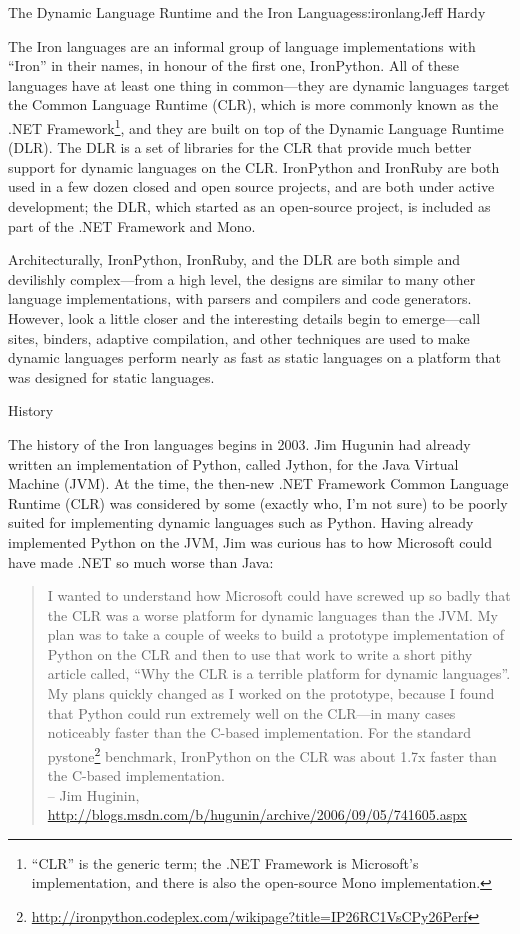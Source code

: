 \begin{aosachapter}{The Dynamic Language Runtime and the Iron Languages}{s:ironlang}{Jeff Hardy}

The Iron languages are an informal group of language implementations with ``Iron'' in their names, in honour of the first one, IronPython. All of these languages have at least one thing in common---they are dynamic languages target the Common Language Runtime (CLR), which is more commonly known as the .NET Framework\footnote{``CLR'' is the generic term; the .NET Framework is Microsoft's implementation, and there is also the open-source Mono implementation.}, and they are built on top of the Dynamic Language Runtime (DLR).  The DLR is a set of libraries for the CLR that provide much better support for dynamic languages on the CLR. IronPython and IronRuby are both used in a few dozen closed and open source projects, and are both under active development; the DLR, which started as an open-source project, is included as part of the .NET Framework and Mono.

Architecturally, IronPython, IronRuby, and the DLR are both simple and devilishly complex---from a high level, the designs are similar to many other language implementations, with parsers and compilers and code generators. However, look a little closer and the interesting details begin to emerge---call sites, binders, adaptive compilation, and other techniques are used to make dynamic languages perform nearly as fast as static languages on a platform that was designed for static languages. 

\begin{aosasect1}{History}

The history of the Iron languages begins in 2003. Jim Hugunin had already written an implementation of Python, called Jython, for the Java Virtual Machine (JVM). At the time, the then-new .NET Framework Common Language Runtime (CLR) was considered by some (exactly who, I'm not sure) to be poorly suited for implementing dynamic languages such as Python. Having already implemented Python on the JVM, Jim was curious has to how Microsoft could have made .NET so much worse than Java:

\begin{quotation}
I wanted to understand how Microsoft could have screwed up so badly that the CLR was a worse platform for dynamic languages than the JVM.  My plan was to take a couple of weeks to build a prototype implementation of Python on the CLR and then to use that work to write a short pithy article called, ``Why the CLR is a terrible platform for dynamic languages''.  My plans quickly changed as I worked on the prototype, because I found that Python could run extremely well on the CLR---in many cases noticeably faster than the C-based implementation.  For the standard pystone\footnote{\url{http://ironpython.codeplex.com/wikipage?title=IP26RC1VsCPy26Perf}} benchmark, IronPython on the CLR was about 1.7x faster than the C-based implementation.\\
-- Jim Huginin, \url{http://blogs.msdn.com/b/hugunin/archive/2006/09/05/741605.aspx}
\end{quotation}


\end{aosasect1}
\end{aosachapter}
